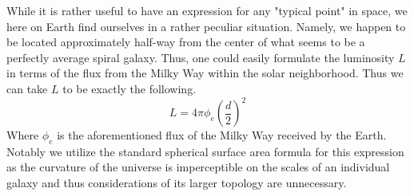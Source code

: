 \documentclass[a4paper]{article}
\begin{document}
    While it is rather useful to have an expression for any "typical point" in
    space, we here on Earth find ourselves in a rather peculiar situation.
    Namely, we happen to be located approximately half-way from the center of
    what seems to be a perfectly average spiral galaxy\footnotemark. Thus, one
    could easily formulate the luminosity $L$ in terms of the flux from the
    Milky Way within the solar neighborhood. Thus we can take $L$ to be exactly
    the following.
    \begin{equation}
        L = 4 \pi \phi_e (\frac{d}{2})^2
    \end{equation}
    Where $\phi_e$ is the aforementioned flux of the Milky Way received by the
    Earth. Notably we utilize the standard spherical surface area formula for
    this expression as the curvature of the universe is imperceptible on the
    scales of an individual galaxy and thus considerations of its larger
    topology are unnecessary.
\end{document}
